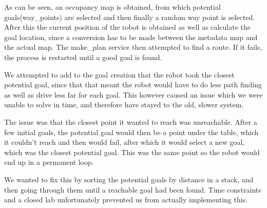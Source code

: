 As can be seen, an occupancy map is obtained, from which potential goals(way\_points) are selected and then finally a random way point is selected. After this the current position of the robot is obtained as well as calculate the goal location, since a conversion has to be made between the metadata map and the actual map. The make\_plan service then attempted to find a route. If it fails, the process is restarted until a good goal is found.

We attempted to add to the goal creation that the robot took the closest potential goal, since that that meant the robot would have to do less path finding as well as drive less far for each goal. This however caused an issue which we were unable to solve in time, and therefore have stayed to the old, slower system. 

The issue was that the closest point it wanted to reach was unreachable. After a few initial goals, the potential goal would then be a point under the table, which it couldn't reach and then would fail, after which it would select a new goal, which was the closest potential goal. This was the same point so the robot would end up in a permanent loop.

We wanted to fix this by sorting the potential goals by distance in a stack, and then going through them until a reachable goal had been found. Time constraints and a closed lab unfortunately prevented us from actually implementing this.
